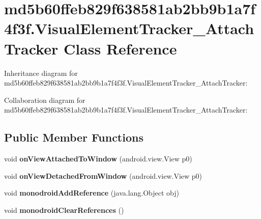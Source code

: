 \hypertarget{classmd5b60ffeb829f638581ab2bb9b1a7f4f3f_1_1_visual_element_tracker___attach_tracker}{}\section{md5b60ffeb829f638581ab2bb9b1a7f4f3f.\+Visual\+Element\+Tracker\+\_\+\+Attach\+Tracker Class Reference}
\label{classmd5b60ffeb829f638581ab2bb9b1a7f4f3f_1_1_visual_element_tracker___attach_tracker}


Inheritance diagram for md5b60ffeb829f638581ab2bb9b1a7f4f3f.\+Visual\+Element\+Tracker\+\_\+\+Attach\+Tracker\+:


Collaboration diagram for md5b60ffeb829f638581ab2bb9b1a7f4f3f.\+Visual\+Element\+Tracker\+\_\+\+Attach\+Tracker\+:
\subsection*{Public Member Functions}
\begin{DoxyCompactItemize}
\item 
\mbox{\label{classmd5b60ffeb829f638581ab2bb9b1a7f4f3f_1_1_visual_element_tracker___attach_tracker_ad14cce97063ca82046c9d85fe80f1557}} 
void {\bfseries on\+View\+Attached\+To\+Window} (android.\+view.\+View p0)
\item 
\mbox{\label{classmd5b60ffeb829f638581ab2bb9b1a7f4f3f_1_1_visual_element_tracker___attach_tracker_aba4af8dd2c0947aedc8cdf3444295589}} 
void {\bfseries on\+View\+Detached\+From\+Window} (android.\+view.\+View p0)
\item 
\mbox{\label{classmd5b60ffeb829f638581ab2bb9b1a7f4f3f_1_1_visual_element_tracker___attach_tracker_afdae8ddc75402aa21d5d750978d45de0}} 
void {\bfseries monodroid\+Add\+Reference} (java.\+lang.\+Object obj)
\item 
\mbox{\label{classmd5b60ffeb829f638581ab2bb9b1a7f4f3f_1_1_visual_element_tracker___attach_tracker_aa7c289b9198727a036075508791a2563}} 
void {\bfseries monodroid\+Clear\+References} ()
\end{DoxyCompactItemize}
